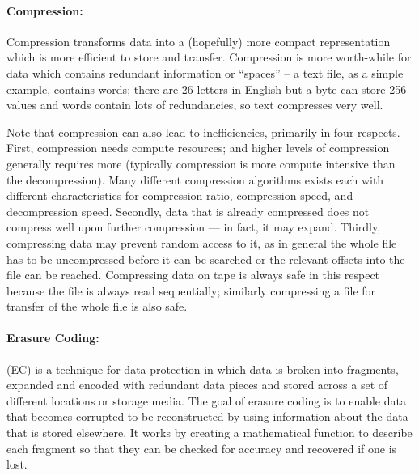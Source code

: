 \paragraph{Compression:}

Compression transforms data into a (hopefully) more compact representation which is more efficient to store and
transfer.  Compression is more worth-while for data which contains redundant information or ``spaces'' -- a text file,
as a simple example, contains words; there are 26 letters in English but a byte can store 256 values and words contain
lots of redundancies, so text compresses very well.


Note that compression can also lead to inefficiencies, primarily in four respects.  First, compression needs compute
resources; and higher levels of compression generally requires more (typically compression is more compute intensive
than the decompression).  Many different compression algorithms exists each with different characteristics for
compression ratio, compression speed, and decompression speed.  Secondly, data that is already compressed does not compress well upon further
compression --- in fact, it may expand.  Thirdly, compressing data may
prevent random access to it, as in general the whole file has to be uncompressed before it can be searched or the
relevant offsets into the file can be reached.  Compressing data on tape is always
safe in this respect because the file is always read sequentially; similarly compressing a file for transfer of the
whole file is also safe.



\paragraph{Erasure Coding:} (EC)
\label{para:erasure_codes}
is a technique for data protection in which data is broken into fragments, expanded and encoded with redundant data pieces and stored across a set of different locations or storage media. The goal of erasure coding is to enable data that becomes corrupted to be reconstructed by using information about the data that is stored elsewhere. It works by creating a mathematical function to describe each
fragment so that they can be checked for accuracy and recovered if one is lost. 


